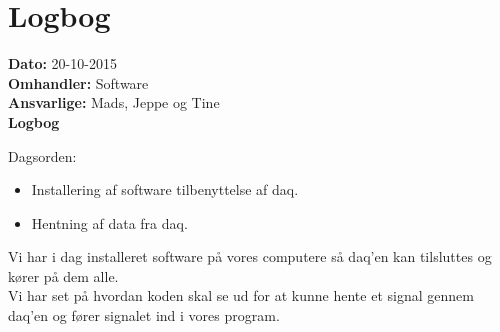 
\section{Logbog}

\textbf{Dato:} 20-10-2015 \\
\textbf{Omhandler:} Software \\
\textbf{Ansvarlige:} Mads, Jeppe og Tine \\
\textbf{Logbog}

Dagsorden:
\begin{itemize}
	\item Installering af software tilbenyttelse af daq.
	\item Hentning af data fra daq. 
\end{itemize}

Vi har i dag installeret software på vores computere så daq'en kan tilsluttes og kører på dem alle.\\
Vi har set på hvordan koden skal se ud for at kunne hente et signal gennem daq'en og fører signalet ind i vores program.\\
   
